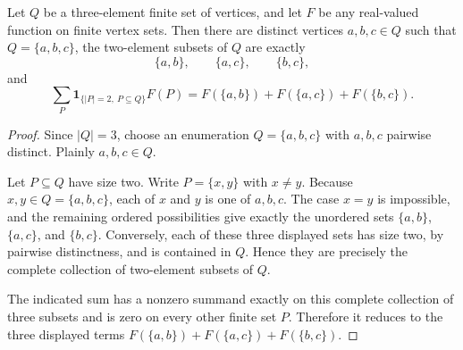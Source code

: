 \begin{helper}
Let $Q$ be a three-element finite set of vertices, and let $F$ be any
real-valued function on finite vertex sets.  Then there are distinct
vertices $a,b,c\in Q$ such that $Q=\{a,b,c\}$, the two-element subsets of
$Q$ are exactly
\[
\{a,b\},\qquad \{a,c\},\qquad \{b,c\},
\]
and
\[
\sum_P \mathbf{1}_{\{|P|=2,\ P\subseteq Q\}} F(P)
=F(\{a,b\})+F(\{a,c\})+F(\{b,c\}).
\]
\end{helper}
\begin{proof}
Since $|Q|=3$, choose an enumeration $Q=\{a,b,c\}$ with
$a,b,c$ pairwise distinct.  Plainly $a,b,c\in Q$.

Let $P\subseteq Q$ have size two.  Write $P=\{x,y\}$ with $x\ne y$.
Because $x,y\in Q=\{a,b,c\}$, each of $x$ and $y$ is one of $a,b,c$.
The case $x=y$ is impossible, and the remaining ordered possibilities give
exactly the unordered sets $\{a,b\}$, $\{a,c\}$, and $\{b,c\}$.  Conversely,
each of these three displayed sets has size two, by pairwise distinctness,
and is contained in $Q$.  Hence they are precisely the complete collection
of two-element subsets of $Q$.

The indicated sum has a nonzero summand exactly on this complete collection
of three subsets and is zero on every other finite set $P$.  Therefore it
reduces to the three displayed terms
$F(\{a,b\})+F(\{a,c\})+F(\{b,c\})$.
\end{proof}
